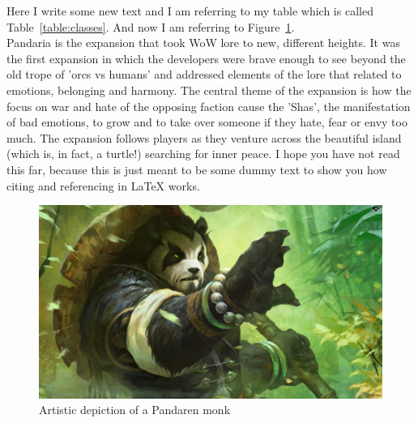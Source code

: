 \documentclass{report}
\begin{document}
\newpage
Here I write some new text and I am referring to my table which is called Table~\ref{table:classes}. And now I am referring to Figure~\ref{fig:panda}.\\

Pandaria is the expansion that took WoW lore to new, different heights. It was the first expansion in which the developers were brave enough to see beyond the old trope of 'orcs vs humans' and addressed elements of the lore that related to emotions, belonging and harmony. The central theme of the expansion is how the focus on war and hate of the opposing faction cause the 'Shas', the manifestation of bad emotions, to grow and to take over someone if they hate, fear or envy too much. The expansion follows players as they venture across the beautiful island (which is, in fact, a turtle!) searching for inner peace. I hope you have not read this far, because this is just meant to be some dummy text to show you how citing and referencing in LaTeX works.

\begin{figure}
	\includegraphics[width=1\linewidth]{MoPimg}
	\caption{Artistic depiction of a Pandaren monk}
	\label{fig:panda}
\end{figure}


\printbibliography[title=References] %
\end{document}

